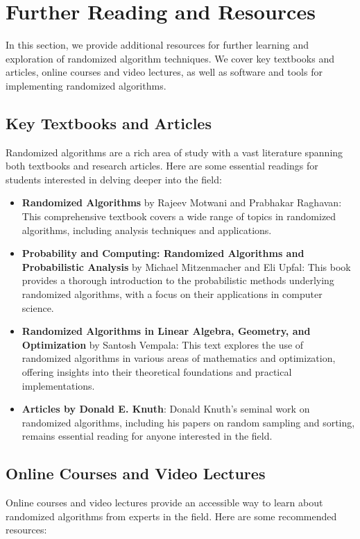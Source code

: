 \documentclass[12pt]{book} %
\begin{document}
\section{Further Reading and Resources}
In this section, we provide additional resources for further learning and exploration of randomized algorithm techniques. We cover key textbooks and articles, online courses and video lectures, as well as software and tools for implementing randomized algorithms.

\subsection{Key Textbooks and Articles}
Randomized algorithms are a rich area of study with a vast literature spanning both textbooks and research articles. Here are some essential readings for students interested in delving deeper into the field:

\begin{itemize}
    \item \textbf{Randomized Algorithms} by Rajeev Motwani and Prabhakar Raghavan: This comprehensive textbook covers a wide range of topics in randomized algorithms, including analysis techniques and applications.
    
    \item \textbf{Probability and Computing: Randomized Algorithms and Probabilistic Analysis} by Michael Mitzenmacher and Eli Upfal: This book provides a thorough introduction to the probabilistic methods underlying randomized algorithms, with a focus on their applications in computer science.
    
    \item \textbf{Randomized Algorithms in Linear Algebra, Geometry, and Optimization} by Santosh Vempala: This text explores the use of randomized algorithms in various areas of mathematics and optimization, offering insights into their theoretical foundations and practical implementations.
    
    \item \textbf{Articles by Donald E. Knuth}: Donald Knuth's seminal work on randomized algorithms, including his papers on random sampling and sorting, remains essential reading for anyone interested in the field.
\end{itemize}

\subsection{Online Courses and Video Lectures}
Online courses and video lectures provide an accessible way to learn about randomized algorithms from experts in the field. Here are some recommended resources:
\end{document}
